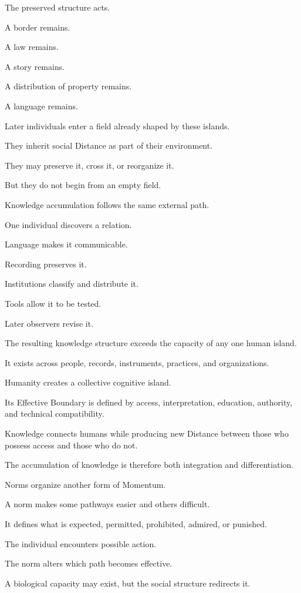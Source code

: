 The preserved structure acts.

A border remains.

A law remains.

A story remains.

A distribution of property remains.

A language remains.

Later individuals enter a field already shaped by these islands.

They inherit social Distance as part of their environment.

They may preserve it, cross it, or reorganize it.

But they do not begin from an empty field.

Knowledge accumulation follows the same external path.

One individual discovers a relation.

Language makes it communicable.

Recording preserves it.

Institutions classify and distribute it.

Tools allow it to be tested.

Later observers revise it.

The resulting knowledge structure exceeds the capacity of any one human island.

It exists across people, records, instruments, practices, and organizations.

Humanity creates a collective cognitive island.

Its Effective Boundary is defined by access, interpretation, education, authority, and technical compatibility.

Knowledge connects humans while producing new Distance between those who possess access and those who do not.

The accumulation of knowledge is therefore both integration and differentiation.

Norms organize another form of Momentum.

A norm makes some pathways easier and others difficult.

It defines what is expected, permitted, prohibited, admired, or punished.

The individual encounters possible action.

The norm alters which path becomes effective.

A biological capacity may exist, but the social structure redirects it.


